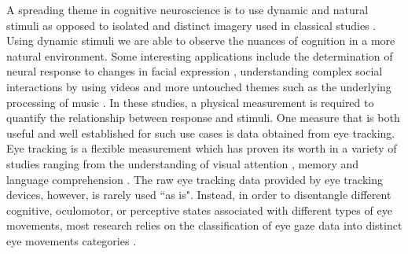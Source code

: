 A spreading theme in cognitive neuroscience is to use dynamic and natural stimuli as opposed to isolated and distinct imagery used in classical studies \citep{real_world}. Using dynamic stimuli we are able to observe the nuances of cognition in a more natural environment. Some interesting applications include the determination of neural response to changes in facial expression \citep{Harris2014}, understanding complex social interactions by using videos \citep{Tikka2012} and more untouched themes such as the underlying processing of music \citep{Toiviainen2014}. In these studies, a physical measurement is required to quantify the relationship between response and stimuli. One measure that is both useful and well established for such use cases is data obtained from eye tracking. Eye tracking is a flexible measurement which has proven its worth in a variety of studies ranging from the understanding of visual attention \citep{HantaoLiu2011}, memory \citep{Hannula2010} and language comprehension \citep{Gordon2006}. The raw eye tracking data provided by eye tracking devices, however, is rarely used ``as is". Instead, in order to disentangle different cognitive, oculomotor, or perceptive states associated with different types of eye movements, most research relies on the classification of eye gaze data into distinct eye movements categories \citep{Schutz2011}. \\

